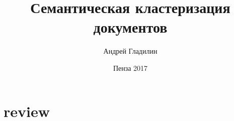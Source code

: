 \documentclass[a4paper,14pt]{report}
\begin{document}
\title{Семантическая кластеризация документов}
\author{Андрей Гладилин}
\date{Пенза 2017}
\maketitle

\chapter{review}
\end{document}

